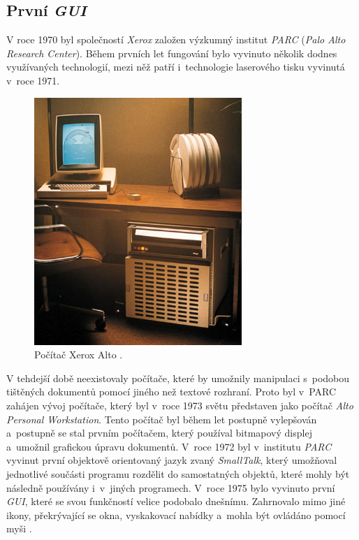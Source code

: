 \documentclass[11pt,twoside,a4paper]{book}
\begin{document}
\subsection{První \textit{GUI}}
V roce 1970 byl společností \textit{Xerox} založen výzkumný institut \textit{PARC} (\textit{Palo Alto Research Center}). Během prvních let fungování bylo vyvinuto několik dodnes využívaných technologií, mezi něž patří i~technologie laserového tisku vyvinutá v~roce 1971. 
\begin{figure}[!ht]
\begin{center}
  \includegraphics[width=0.7\textwidth]{figures/XeroxAlto}
\caption{{\label{fig:alto}}Počítač Xerox Alto \cite{bib:altoImage}.}
\end{center}
\end{figure}
V tehdejší době neexistovaly počítače, které by umožnily manipulaci s~podobou tištěných dokumentů pomocí jiného než textové rozhraní. Proto byl v~PARC zahájen vývoj počítače, který byl v~roce 1973 světu představen jako počítač \textit{Alto Personal Workstation}. Tento počítač byl během let postupně vylepšován a~postupně se stal prvním počítačem, který používal bitmapový displej a~umožnil grafickou úpravu dokumentů. V~roce 1972 byl v~institutu \textit{PARC} vyvinut první objektově orientovaný jazyk zvaný \textit{SmallTalk}, který umožňoval jednotlivé součásti programu rozdělit do samostatných objektů, které mohly být následně používány i~v~jiných programech. V~roce 1975 bylo vyvinuto první \textit{GUI}, které se svou funkčností velice podobalo dnešnímu. Zahrnovalo mimo jiné ikony, překrývající se okna, vyskakovací nabídky a~mohla být ovládáno pomocí myši \cite{bib:PARC}.
\end{document}
